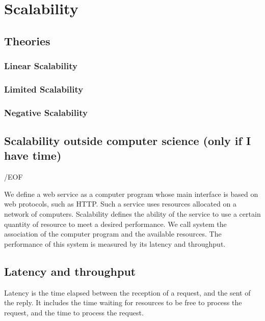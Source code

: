
\section{Scalability}
  \subsection{Theories}
    \subsubsection{Linear Scalability}
    \subsubsection{Limited Scalability}
    \subsubsection{Negative Scalability}
  \subsection{Scalability outside computer science (only if I have time)}

/EOF



We define a web service as a computer program whose main interface is based on web protocols, such as HTTP.
Such a service uses resources allocated on a network of computers.
Scalability defines the ability of the service to use a certain quantity of resource to meet a desired performance.
We call system the association of the computer program and the available resources. 
The performance of this system is measured by its latency and throughput.

\subsection{Latency and throughput}

Latency is the time elapsed between the reception of a request, and the sent of the reply.
It includes the time waiting for resources to be free to process the request, and the time to process the request.

